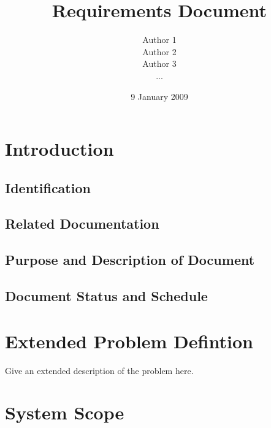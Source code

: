 \documentclass{l3deliverable}
\title{Requirements Document}
\author{Author 1 \\
        Author 2 \\
        Author 3 \\
        ...}
\date{9 January 2009}
\begin{document}

\maketitle

\tableofcontents

\newpage


\section{Introduction}

\subsection{Identification}

\subsection{Related Documentation}

\subsection{Purpose and Description of Document}

\subsection{Document Status and Schedule}


\section{Extended Problem Defintion}


Give an extended description of the problem here.


\section{System Scope}
\end{document}

